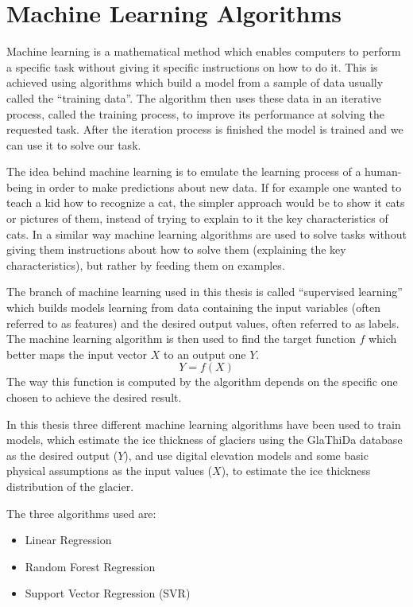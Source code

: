 \section{Machine Learning Algorithms}\label{ML}
Machine learning is a mathematical method which enables computers to perform a specific task without giving it specific instructions on how to do it. This is achieved using algorithms which build a model from a sample of data usually called the ``training data''. The algorithm then uses these data in an iterative process, called the training process, to improve its performance at solving the requested task. After the iteration process is finished the model is trained and we can use it to solve our task. 

The idea behind machine learning is to emulate the learning process of a human-being in order to make predictions about new data. If for example one wanted to teach a kid how to recognize a cat, the simpler approach would be to show it cats or pictures of them, instead of trying to explain to it the key characteristics of cats. In a similar way machine learning algorithms are used to solve tasks without giving them instructions about how to solve them (explaining the key characteristics), but rather by feeding them on examples.

The branch of machine learning used in this thesis is called ``supervised learning'' which builds models learning from data containing the input variables (often referred to as features) and the desired output values, often referred to as labels.
The machine learning algorithm is then used to find the target function $f$ which better maps the input vector $X$ to an output one $Y$.
\begin{equation}
Y = f(X)
\end{equation}
The way this function is computed by the algorithm depends on the specific one chosen to achieve the desired result.

In this thesis three different machine learning algorithms have been used to train models, which estimate the ice thickness of glaciers using the GlaThiDa database as the desired output ($Y$), and use digital elevation models and some basic physical assumptions as the input values ($X$), to estimate the ice thickness distribution of the glacier.

The three algorithms used are:
\begin{itemize}
	\item Linear Regression
	\item Random Forest Regression
	\item Support Vector Regression (SVR)
\end{itemize}

